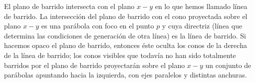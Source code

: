 El plano de barrido intersecta con el plano $x-y$ en lo que hemos llamado línea de barrido. La intersección del plano de barrido con el cono proyectada sobre el plano $x-y$ es una parábola con foco en el punto $p$ y cuya directriz (línea que determina las condiciones de generación de otra línea) es la línea de barrido. Si hacemos opaco el plano de barrido, entonces éste oculta los conos de la derecha de la línea de barrido; los conos visibles que todavía no han sido totalmente barridos por el plano de barrido proyectarán sobre el plano $x-y$ un conjunto de parábolas apuntando hacia la izquierda, con ejes paralelos y distintas anchuras.

\begin{figure}[H]
\end{figure}
